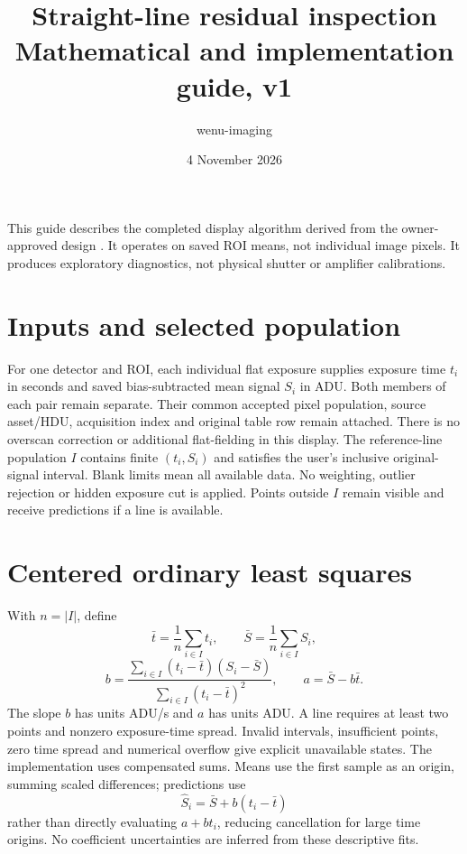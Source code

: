 \documentclass[11pt,a4paper]{article}
\title{Straight-line residual inspection\\Mathematical and implementation guide, v1}
\author{wenu-imaging}
\date{4 November 2026}
\begin{document}
\maketitle
\noindent This guide describes the completed display algorithm derived from the
owner-approved design .
It operates on saved ROI means, not individual image pixels. It produces
exploratory diagnostics, not physical shutter or amplifier calibrations.

\section{Inputs and selected population}
For one detector and ROI, each individual flat exposure supplies exposure time
$t_i$ in seconds and saved bias-subtracted mean signal $S_i$ in ADU. Both members
of each pair remain separate. Their common accepted pixel population, source
asset/HDU, acquisition index and original table row remain attached.
There is no overscan correction or additional flat-fielding in this display.
The reference-line population $I$ contains finite $(t_i,S_i)$ and satisfies the
user's inclusive original-signal interval. Blank limits mean all available data.
No weighting, outlier rejection or hidden exposure cut is applied. Points outside
$I$ remain visible and receive predictions if a line is available.

\section{Centered ordinary least squares}
With $n=|I|$, define
\[
 \bar t=\frac1n\sum_{i\in I}t_i,\qquad
 \bar S=\frac1n\sum_{i\in I}S_i,
\]
\[
 b=\frac{\sum_{i\in I}(t_i-\bar t)(S_i-\bar S)}
          {\sum_{i\in I}(t_i-\bar t)^2},\qquad
 a=\bar S-b\bar t.
\]
The slope $b$ has units ADU/s and $a$ has units ADU. A line requires at least two
points and nonzero exposure-time spread. Invalid intervals, insufficient points,
zero time spread and numerical overflow give explicit unavailable states.
The implementation uses compensated sums. Means use the first sample as an
origin, summing scaled differences; predictions use
\[
 \widehat S_i=\bar S+b(t_i-\bar t)
\]
rather than directly evaluating $a+bt_i$, reducing cancellation for large time
origins. No coefficient uncertainties are inferred from these descriptive fits.
\end{document}
